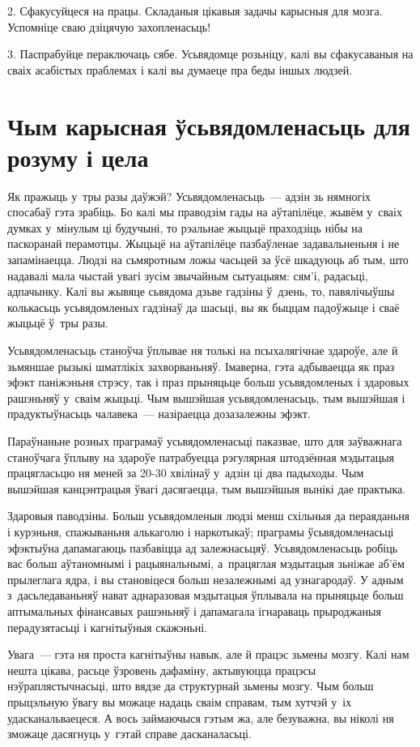 2. Сфакусуйцеся на працы. Складаныя цікавыя задачы карысныя для мозга. Успомніце сваю дзіцячую захопленасьць!

3. Паспрабуйце пераключаць сябе. Усьвядомце розьніцу, калі вы сфакусаваныя на сваіх асабістых праблемах і калі вы думаеце пра беды іншых людзей.


\section{Чым карысная ўсьвядомленасьць для розуму і цела}

Як пражыць у~тры разы даўжэй? Усьвядомленасьць~--- адзін зь нямногіх спосабаў гэта зрабіць. Бо калі мы праводзім гады на аўтапілёце, жывём у~сваіх думках у~мінулым ці будучыні, то рэальнае жыцьцё праходзіць нібы на паскоранай перамотцы. Жыцьцё на аўтапілёце пазбаўленае задавальненьня і не запамінаецца. Людзі на сьмяротным ложы часьцей за ўсё шкадуюць аб тым, што надавалі мала чыстай увагі зусім звычайным сытуацыям: сям'і, радасьці, адпачынку. Калі вы жывяце сьвядома дзьве гадзіны ў~дзень, то, павялічыўшы колькасьць усьвядомленых гадзінаў да шасьці, вы як быццам падоўжыце і сваё жыцьцё ў~тры разы.

Усьвядомленасьць станоўча ўплывае ня толькі на псыхалягічнае здароўе, але й зьмяншае рызыкі шматлікіх захворваньняў. Імаверна, гэта адбываецца як праз эфэкт паніжэньня стрэсу, так і праз прыняцьце больш усьвядомленых і здаровых рашэньняў у~сваім жыцьці. Чым вышэйшая усьвядомленасьць, тым вышэйшая і прадуктыўнасьць чалавека~--- назіраецца дозазалежны эфэкт.

Параўнаньне розных праграмаў усьвядомленасьці паказвае, што для заўважнага станоўчага ўплыву на здароўе патрабуецца рэгулярная штодзённая мэдытацыя працягласьцю ня меней за 20-30 хвілінаў у~адзін ці два падыходы. Чым вышэйшая канцэнтрацыя ўвагі дасягаецца, тым вышэйшыя вынікі дае практыка.

Здаровыя паводзіны. Больш усьвядомленыя людзі менш схільныя да пераяданьня і курэньня, спажываньня алькаголю і наркотыкаў; праграмы ўсьвядомленасьці эфэктыўна дапамагаюць пазбавіцца ад залежнасьцяў. Усьвядомленасьць робіць вас больш аўтаномнымі і рацыянальнымі, а~працяглая мэдытацыя зьніжае аб'ём прылеглага ядра, і вы становіцеся больш незалежнымі ад узнагародаў. У адным з~дасьледаваньняў нават аднаразовая мэдытацыя ўплывала на прыняцьце больш аптымальных фінансавых рашэньняў і дапамагала ігнараваць прыроджаныя перадузятасьці і кагнітыўныя скажэньні.

Увага~--- гэта ня проста кагнітыўны навык, але й працэс зьмены мозгу. Калі нам нешта цікава, расьце ўзровень дафаміну, актывуюцца працэсы нэўраплястычнасьці, што вядзе да структурнай зьмены мозгу. Чым больш прыцэльную ўвагу вы можаце надаць сваім справам, тым хутчэй у~іх удасканальваецеся. А вось займаючыся гэтым жа, але безуважна, вы ніколі ня зможаце дасягнуць у~гэтай справе дасканаласьці.

